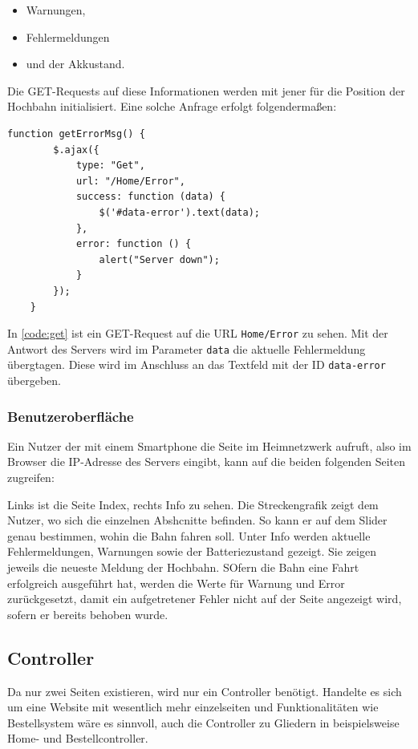 \begin{center}
	\begin{itemize}
		\item Warnungen,
		\item Fehlermeldungen
		\item und der Akkustand.
	\end{itemize}
\end{center}

Die GET-Requests auf diese Informationen werden mit jener für die Position der Hochbahn initialisiert. Eine solche Anfrage erfolgt folgendermaßen:

\begin{lstlisting}[language=html, style=dhpaperdefault]
	function getErrorMsg() {
		$.ajax({
			type: "Get",
			url: "/Home/Error",
			success: function (data) {
				$('#data-error').text(data);
			},
			error: function () {
				alert("Server down");
			}
		});
    }
\end{lstlisting}
\vspace{1cm}
In \autoref{code:get} ist ein GET-Request auf die URL \texttt{Home/Error} zu sehen. Mit der Antwort des Servers wird im Parameter \texttt{data} die aktuelle Fehlermeldung übergtagen. Diese wird im Anschluss an das Textfeld mit der ID \texttt{data-error} übergeben. 

\subsubsection{Benutzeroberfläche}
Ein Nutzer der mit einem Smartphone die Seite im Heimnetzwerk aufruft, also im Browser die IP-Adresse des Servers eingibt, kann auf die beiden folgenden Seiten zugreifen:


Links ist die Seite Index, rechts Info zu sehen. Die Streckengrafik zeigt dem Nutzer, wo sich die einzelnen Abshcnitte befinden. So kann er auf dem Slider genau bestimmen, wohin die Bahn fahren soll. Unter Info werden aktuelle Fehlermeldungen, Warnungen sowie der Batteriezustand gezeigt. Sie zeigen jeweils die neueste Meldung der Hochbahn. SOfern die Bahn eine Fahrt erfolgreich ausgeführt hat, werden die Werte für Warnung und Error zurückgesetzt, damit ein aufgetretener Fehler nicht auf der Seite angezeigt wird, sofern er bereits behoben wurde. 

\subsection{Controller}
\label{sec:controller}
Da nur zwei Seiten existieren, wird nur ein Controller benötigt. Handelte es sich um eine Website mit wesentlich mehr einzelseiten und Funktionalitäten wie Bestellsystem wäre es sinnvoll, auch die Controller zu Gliedern in beispielsweise Home- und Bestellcontroller. \\
